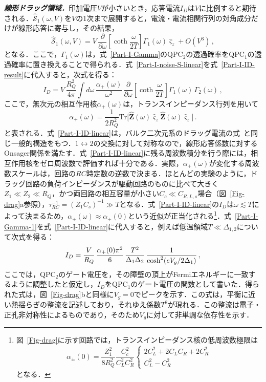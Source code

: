 \documentclass[a4paper,11pt]{ltjsarticle}
\def\Tr{\mathrm{Tr}}
\begin{document}
\textbf{\textit{線形ドラッグ領域．}}印加電圧$V$が小さいとき，応答電流$I_D$は$V$に比例すると期待される．$\hat{\mathcal{S}}_{1}(\omega,V)$を$V$の1次まで展開すると，電流・電流相関行列の対角成分だけが線形応答に寄与し，その結果，
\begin{equation}\label{Part-I-noise-S-linear}
\hat{\mathcal{S}}_{1}(\omega,V)=V\, \frac{\partial}{\partial\omega}
\left[\coth\frac{\omega}{2T}\right]\Gamma_{1}(\omega)\hat{\varsigma}_{z} +O(V^3)\,,
\end{equation}
となる．ここで，$\Gamma_{1}(\omega)$は，式~\eqref{Part-I-Gamma}のQPC$_2$の透過確率をQPC$_1$の透過確率に置き換えることで得られる．式~\eqref{Part-I-noise-S-linear}を式~\eqref{Part-I-ID-result}に代入すると，次式を得る：
\begin{equation}\label{Part-I-ID-linear}
I_{D}=V\, \frac{R^{2}_{Q}}{4\pi}\int
d\omega\,\frac{\alpha_{+}(\omega)}{\omega^{2}}\,
\frac{\partial}{\partial\omega}\left[\coth\frac{\omega}{2T}\right]
\Gamma_{1}(\omega)\, \Gamma_{2}(\omega)\,,
\end{equation}
ここで，無次元の相互作用核$\alpha_{+}(\omega)$は，トランスインピーダンス行列を用いて$$\alpha_{+}(\omega)=\frac{1}{2R^{2}_{Q}}\Tr\big[
\hat{\mathbf{Z}}(\omega)\hat{\varsigma}_{z}
\hat{\mathbf{Z}}(\omega)\hat{\varsigma}_{z}\big]\,.$$と表される．式~\eqref{Part-I-ID-linear}は，バルク二次元系のドラッグ電流の式~\cite{Kamenev-Oreg,Flensberg}と同じ一般的構造をもつ．$1\leftrightarrow 2$の交換に対して対称なので，線形応答係数に対するOnsager関係を満たす．式~\eqref{Part-I-ID-linear}に残る周波数積分を行う際には，相互作用核をゼロ周波数で評価すれば十分である．実際，$\alpha_{+}(\omega)$が変化する周波数スケールは，回路の$RC$時定数の逆数で決まる．ほとんどの実験のように，ドラッグ回路の負荷インピーダンスが駆動回路のものに比べて大きく$Z_{1}\ll Z_2\ll R_Q$，かつ両回路の相互容量が小さい$C_c\ll C_{R,L,s}$場合（図~\ref{Fig-drag}a参照），$\tau^{-1}_{RC}=(Z_1 C_s)^{-1}\gg
T$となる．式~\eqref{Part-I-ID-linear}の$I_{D}$は$\omega\lesssim T$によって決まるため，$\alpha_{+}(\omega)\approx\alpha_{+}(0)$という近似が正当化される\footnote{図~\ref{Fig-drag}に示す回路では，トランスインピーダンス核の低周波数極限は$$\alpha_{\pm}(0)=\frac{Z^{2}_{1}}{8R^{2}_{Q}}\frac{C^{2}_{c}}{C^{2}_{L}C^{2}_{R}}
\left\{\begin{array}{l}2C^{2}_{L}+2C_{L}C_{R}+2C^{2}_{R}\\
C^{2}_{L}-C^{2}_{R}
\end{array}\right.$$となる．}．式~\eqref{Part-I-Gamma-1}を式~\eqref{Part-I-ID-linear}に代入すると，例えば低温領域$T\ll \Delta_{1,2}$について次式を得る：
\begin{equation}\label{Part-I-ID-linear-1}
I_D= \frac{V}{R_{Q}}\,   \frac{\alpha_{+}(0)\pi^2}{6}\, {T^{2}\over
\Delta_1\Delta_2}\,  {1\over \cosh^{2}(eV_{g}/2\Delta_1)}\,,
\end{equation}
ここでは，QPC$_2$のゲート電圧を，その障壁の頂上がFermiエネルギーに一致するように調整したと仮定し，$I_D$をQPC$_1$のゲート電圧の関数として書いた．得られた式は，図~\ref{Fig-drag}bと同様に$V_g=0$でピークを示す．この式は，平衡に近い熱揺らぎの整流を記述しており，それゆえ係数$T^2$が現れる．この整流は電子・正孔非対称性によるものであり，そのため$V_g$に対して非単調な依存性を示す．
\end{document}
